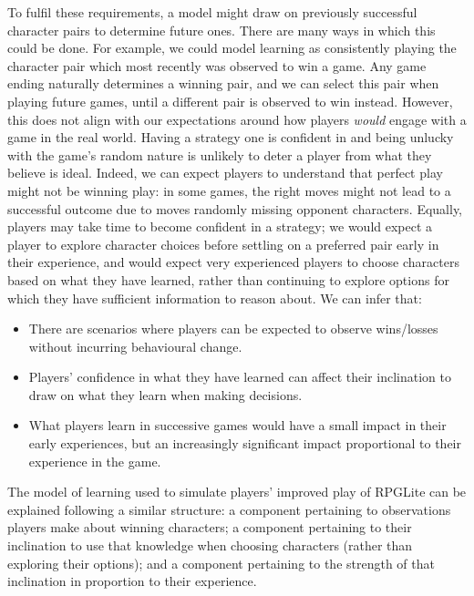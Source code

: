 To fulfil these requirements, a model might draw on previously successful
character pairs to determine future ones. There are many ways in which this
could be done. For example, we could model learning as consistently playing the
character pair which most recently was observed to win a game. Any game ending
naturally determines a winning pair, and we can select this pair when playing
future games, until a different pair is observed to win instead. However, this
does not align with our expectations around how players \emph{would} engage with
a game in the real world. Having a strategy one is confident in and being
unlucky with the game's random nature is unlikely to deter a player from what
they believe is ideal. Indeed, we can expect players to understand
that perfect play might not be winning play: in some games, the right moves
might not lead to a successful outcome due to moves randomly missing opponent
characters. Equally, players may take time to become confident in a strategy; we
would expect a player to explore character choices before settling on a
preferred pair early in their experience, and would expect very experienced
players to choose characters based on what they have learned, rather than
continuing to explore options for which they have sufficient information to
reason about. We can infer that:

\begin{itemize}
  \item There are scenarios where players can be expected to observe wins/losses
  without incurring behavioural change.
  \item Players' confidence in what they have learned can affect their
  inclination to draw on what they learn when making decisions.
  \item What players learn in successive games would have a small impact in
  their early experiences, but an increasingly significant impact proportional
  to their experience in the game.
\end{itemize}

The model of learning used to simulate players' improved play of RPGLite can be
explained following a similar structure: a component pertaining to observations
players make about winning characters; a component pertaining to their inclination
to use that knowledge when choosing characters (rather than exploring their options);
and a component pertaining to the strength of that inclination in proportion to their
experience.


